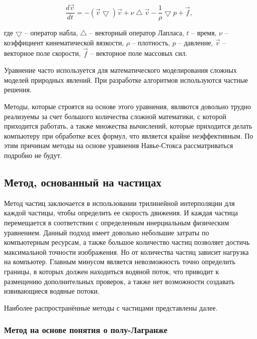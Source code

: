 \begin{equation}
    \frac{d\vec{v}}{dt} = -(\vec{v}	\bigtriangledown)\vec{v} + \nu \bigtriangleup \vec{v} - \frac{1}{\rho} \bigtriangledown p + \vec{f},
\end{equation}

где $\bigtriangledown$ -- оператор набла, $\bigtriangleup$ -- векторный оператор Лапласа, $t$ -- время, \linebreak $\nu$ -- коэффициент кинематической вязкости, $\rho$ -- плотность, $p$ -- давление, $\vec{v}$ -- векторное поле скорости, $\vec{f}$ -- векторное поле массовых сил.

Уравнение часто используется для математического моделирования сложных моделей природных явлений. При разработке алгоритмов используются частные решения.

Методы, которые строятся на основе этого уравнения, являются довольно трудно реализуемы за счет большого количества сложной математики, с которой приходится работать, а также множества вычислений, которые приходится делать компьютеру при обработке всех формул, что является крайне неэффективным. По этим причинам методы на основе уравнения Навье-Стокса рассматриваться подробно не будут. \cite{navier-stokes-cg}

\subsection{Метод, основанный на частицах}

Метод частиц заключается в использовании трилинейной интерполяции для каждой частицы, чтобы определить ее скорость движения. И каждая частица перемещается в соответствии с определенным инерциальным физическим уравнением. Данный подход имеет довольно небольшие затраты по компьютерным ресурсам, а также большое количество частиц позволяет достичь максимальной точности изображения. Но от количества частиц зависит нагрузка на компьютер. Главным минусом является невозможность точно определить границы, в которых должен находиться водяной поток, что приводит к размещению дополнительных проверок, а также нет возможности создавать извивающиеся водяные потоки.

Наиболее распространённые методы с частицами представлены далее.

\subsubsection{Метод на основе понятия о полу-Лагранже}


